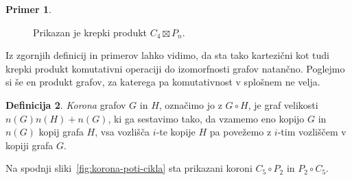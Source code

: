 \documentclass[12pt,a4paper,twoside]{article}
\theoremstyle{definition} %
\newtheorem{definicija}{Definicija}[section]
\newtheorem{primer}[definicija]{Primer}
\theoremstyle{plain} %
\numberwithin{equation}{section}  %
\begin{document}
\begin{primer}
\begin{figure}[h]
        \caption{Prikazan je krepki produkt $C_4 \boxtimes P_n$.}
        \label{fig:krep-produkt-cikel-pot}
    \end{figure}
\end{primer}

Iz zgornjih definicij in primerov lahko vidimo, da sta tako kartezični kot tudi krepki produkt komutativni operaciji do izomorfnosti grafov natančno. Poglejmo si še en produkt grafov, za katerega pa komutativnost v splošnem ne velja.

\begin{definicija}
    \emph{Korona} grafov $G$ in $H$, označimo jo z $G \circ H$, je graf velikosti $n(G) n(H) + n(G)$, ki ga sestavimo tako, da vzamemo eno kopijo $G$ in $n(G)$ kopij grafa $H$, vsa vozlišča $i$-te kopije $H$ pa povežemo z $i$-tim vozliščem v kopiji grafa $G$.
\end{definicija}
Na spodnji sliki~\ref{fig:korona-poti-cikla} sta prikazani koroni $C_5 \circ P_2$ in $P_2 \circ C_5$.
\end{document}
